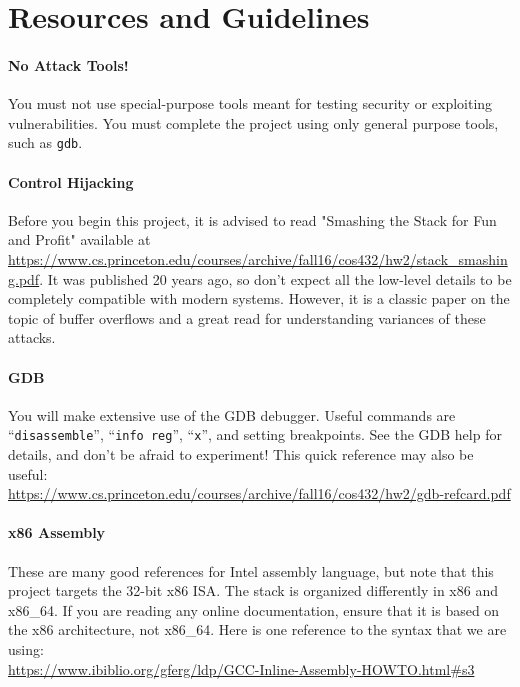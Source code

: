 \documentclass[letterpaper,12pt]{report}
\begin{document}
{\begin{enumerate}
\end{enumerate}



\section*{Resources and Guidelines}

\vspace{-3pt} \paragraph{No Attack Tools!} You must not use special-purpose
tools meant for testing security or exploiting vulnerabilities.  You must
complete the project using only general purpose tools, such as \texttt{gdb}.

\vspace{-6pt} 
\paragraph{Control Hijacking} 
Before you begin this project, it is advised to read
"Smashing the Stack for Fun and Profit" available at
\url{https://www.cs.princeton.edu/courses/archive/fall16/cos432/hw2/stack_smashing.pdf}.  
It was published 20 years ago, so don't expect all the low-level details to be
completely compatible with modern systems. However, it is a classic
paper on the topic of buffer overflows and a great read for
understanding variances of these attacks.


\vspace{-6pt}
\paragraph{GDB}
You will make extensive use of the GDB debugger. Useful commands 
are ``\texttt{disassemble}'', ``\texttt{info reg}'', ``\texttt{x}'',
and setting breakpoints. See the GDB help for details, and don't be afraid to
experiment!  This quick reference may also be useful: \\
\url{https://www.cs.princeton.edu/courses/archive/fall16/cos432/hw2/gdb-refcard.pdf}

\vspace{-6pt} \paragraph{x86 Assembly} These are many good references for Intel
assembly language, but note that this project targets the 32-bit x86 ISA.  The
stack is organized differently in x86 and x86\_64. If you are reading any online
documentation, ensure that it is based on the x86 architecture, not  x86\_64.
Here is one reference to the syntax that we are using: \\
\url{https://www.ibiblio.org/gferg/ldp/GCC-Inline-Assembly-HOWTO.html#s3}

}
\end{document}
